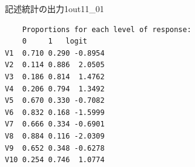 \begin{Rscreen}{記述統計の出力1}{out11_01}
	\begin{verbatim}
    Proportions for each level of response:
    0     1   logit
V1  0.710 0.290 -0.8954
V2  0.114 0.886  2.0505
V3  0.186 0.814  1.4762
V4  0.206 0.794  1.3492
V5  0.670 0.330 -0.7082
V6  0.832 0.168 -1.5999
V7  0.666 0.334 -0.6901
V8  0.884 0.116 -2.0309
V9  0.652 0.348 -0.6278
V10 0.254 0.746  1.0774
\end{verbatim}
\end{Rscreen}
